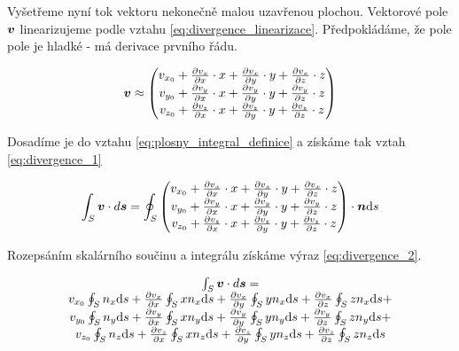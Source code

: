 Vyšetřeme nyní tok vektoru nekonečně malou uzavřenou plochou. Vektorové pole \(\boldsymbol{v}\) linearizujeme podle vztahu \eqref{eq:divergence_linearizace}.
Předpokládáme, že pole pole je hladké - má derivace prvního řádu.

\begin{equation}
\label{eq:divergence_linearizace}
\boldsymbol{v} \approx \begin{pmatrix}
v_{x_0} + \frac{\partial v_x}{\partial x} \cdot x + \frac{\partial v_x}{\partial y} \cdot y + \frac{\partial v_x}{\partial z} \cdot z \\
v_{y_0} + \frac{\partial v_y}{\partial x} \cdot x + \frac{\partial v_y}{\partial y} \cdot y + \frac{\partial v_y}{\partial z} \cdot z \\
v_{z_0} + \frac{\partial v_z}{\partial x} \cdot x + \frac{\partial v_z}{\partial y} \cdot y + \frac{\partial v_z}{\partial z} \cdot z
\end{pmatrix}
\end{equation}

Dosadíme je do vztahu \eqref{eq:plosny_integral_definice} a získáme tak vztah \eqref{eq:divergence_1}

\begin{equation}
\label{eq:divergence_1}
\begin{split}
\int_S \boldsymbol{v} \cdot d\boldsymbol{s} = \oint_S \begin{pmatrix}
v_{x_0} + \frac{\partial v_x}{\partial x} \cdot x + \frac{\partial v_x}{\partial y} \cdot y + \frac{\partial v_x}{\partial z} \cdot z \\
v_{y_0} + \frac{\partial v_y}{\partial x} \cdot x + \frac{\partial v_y}{\partial y} \cdot y + \frac{\partial v_y}{\partial z} \cdot z \\
v_{z_0} + \frac{\partial v_z}{\partial x} \cdot x + \frac{\partial v_z}{\partial y} \cdot y + \frac{\partial v_z}{\partial z} \cdot z
\end{pmatrix} \cdot \boldsymbol{n} \mathrm{d}s
\end{split}
\end{equation}

Rozepsáním skalárního součinu a integrálu získáme výraz \eqref{eq:divergence_2}.

\begin{equation}
\label{eq:divergence_2}
\begin{matrix}
\int_S \boldsymbol{v} \cdot d\boldsymbol{s} = \\
v_{x_0} \oint_S n_x \mathrm{d}s + \frac{\partial v_x}{\partial x} \oint_S x n_x \mathrm{d}s + \frac{\partial v_x}{\partial y} \oint_S y n_x \mathrm{d}s + \frac{\partial v_x}{\partial z} \oint_S z n_x \mathrm{d}s + \\
v_{y_0} \oint_S n_y \mathrm{d}s + \frac{\partial v_y}{\partial x} \oint_S x n_y \mathrm{d}s + \frac{\partial v_y}{\partial y} \oint_S y n_y \mathrm{d}s + \frac{\partial v_y}{\partial z} \oint_S z n_y \mathrm{d}s + \\
v_{z_0} \oint_S n_z \mathrm{d}s + \frac{\partial v_z}{\partial x} \oint_S x n_z \mathrm{d}s + \frac{\partial v_z}{\partial y} \oint_S y n_z \mathrm{d}s + \frac{\partial v_z}{\partial z} \oint_S z n_z \mathrm{d}s
\end{matrix}
\end{equation}

